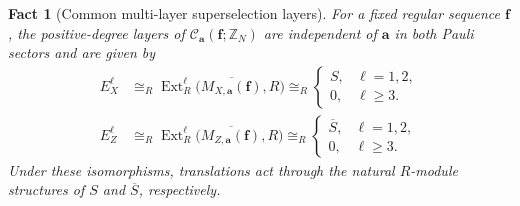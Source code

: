 \documentclass[aps,prx,english,superscriptaddress,twocolumn,tightenlines,showpacs,longbibliography,floatfix,amsfonts]{revtex4-2}
\newtheorem{fact}{Fact}
\theoremstyle{remark}
\theoremstyle{definition}
\begin{document}
\begin{fact}[Common multi-layer superselection layers]
	\label{prop:block-extension-profile}
	For a fixed regular sequence \(\mathbf f\), the positive-degree layers of
	\(\mathcal C_{\mathbf a}(\mathbf f;\mathbb Z_N)\) are independent of
	\(\mathbf a\) in both Pauli sectors and are given by
	\begin{align}
		E_X^\ell
		&\cong_R\operatorname{Ext}_R^\ell
		\bigl(\overline{M_{X,\mathbf a}(\mathbf f)},R\bigr)
		\cong_R
		\begin{cases}
			S,&\ell=1,2,\\
			0,&\ell\geq3.
		\end{cases}
		\label{eq:block-extension-profile}\\
		E_Z^\ell
		&\cong_R\operatorname{Ext}_R^\ell
		\bigl(\overline{M_{Z,\mathbf a}(\mathbf f)},R\bigr)
		\cong_R
		\begin{cases}
			\overline S,&\ell=1,2,\\
			0,&\ell\geq3.
		\end{cases}
		\label{eq:block-extension-profile-Z}
	\end{align}
	Under these isomorphisms, translations act through the natural
	\(R\)-module structures of \(S\) and \(\overline S\), respectively.
\end{fact}
\end{document}
